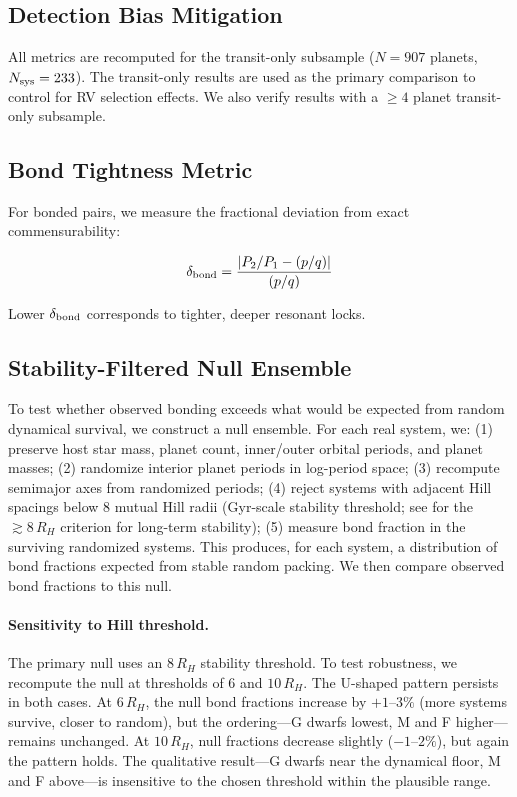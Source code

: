 \documentclass[twocolumn,usenatbib]{mnras}
\begin{document}
\subsection{Detection Bias Mitigation}

All metrics are recomputed for the transit-only subsample ($N = 907$ planets,
$N_{\rm sys} = 233$). The transit-only results are used as the primary
comparison to control for RV selection effects. We also verify results with a
$\geq 4$ planet transit-only subsample.

\subsection{Bond Tightness Metric}

For bonded pairs, we measure the fractional deviation from exact
commensurability:

\begin{equation}
\delta_{\rm bond} = \frac{|P_2/P_1 - (p/q)|}{(p/q)}
\label{eq:tightness}
\end{equation}

Lower $\delta_{\rm bond}$ corresponds to tighter, deeper resonant locks.

\subsection{Stability-Filtered Null Ensemble}

To test whether observed bonding exceeds what would be expected from random
dynamical survival, we construct a null ensemble. For each real system, we:
(1) preserve host star mass, planet count, inner/outer orbital periods, and
planet masses; (2) randomize interior planet periods in log-period space;
(3) recompute semimajor axes from randomized periods; (4) reject systems with
adjacent Hill spacings below 8 mutual Hill radii (Gyr-scale stability
threshold; see \citet{puwu2015} for the $\gtrsim 8\,R_H$ criterion for
long-term stability); (5) measure bond fraction in the surviving randomized
systems. This produces, for each system, a distribution of bond fractions
expected from stable random packing. We then compare observed bond fractions
to this null.

\paragraph{Sensitivity to Hill threshold.}
The primary null uses an $8\,R_H$ stability threshold. To test robustness, we
recompute the null at thresholds of 6 and $10\,R_H$. The U-shaped pattern
persists in both cases. At $6\,R_H$, the null bond fractions increase by
$+1$--$3\%$ (more systems survive, closer to random), but the ordering---G
dwarfs lowest, M and F higher---remains unchanged. At $10\,R_H$, null fractions
decrease slightly ($-1$--$2\%$), but again the pattern holds. The qualitative
result---G dwarfs near the dynamical floor, M and F above---is insensitive to
the chosen threshold within the plausible range.
\end{document}
